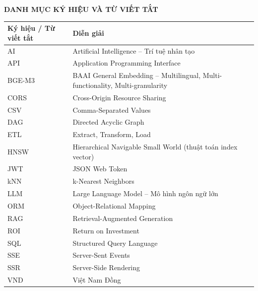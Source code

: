 \thispagestyle{empty}


\listoffigures

\newpage

\thispagestyle{empty}


\listoftables

\newpage

\thispagestyle{empty}

\begin{center}
    {\fontsize{13}{16}\selectfont\bfseries DANH MỤC KÝ HIỆU VÀ TỪ VIẾT TẮT}
\end{center}

\vspace{0.8cm}

\begin{longtable}{|p{3.5cm}|p{9.5cm}|}
    \hline
    \textbf{Ký hiệu / Từ viết tắt} & \textbf{Diễn giải} \\
    \hline
    AI & Artificial Intelligence -- Trí tuệ nhân tạo \\
    \hline
    API & Application Programming Interface \\
    \hline
    BGE-M3 & BAAI General Embedding -- Multilingual, Multi-functionality, Multi-granularity \\
    \hline
    CORS & Cross-Origin Resource Sharing \\
    \hline
    CSV & Comma-Separated Values \\
    \hline
    DAG & Directed Acyclic Graph \\
    \hline
    ETL & Extract, Transform, Load \\
    \hline
    HNSW & Hierarchical Navigable Small World (thuật toán index vector) \\
    \hline
    JWT & JSON Web Token \\
    \hline
    kNN & k-Nearest Neighbors \\
    \hline
    LLM & Large Language Model -- Mô hình ngôn ngữ lớn \\
    \hline
    ORM & Object-Relational Mapping \\
    \hline
    RAG & Retrieval-Augmented Generation \\
    \hline
    ROI & Return on Investment \\
    \hline
    SQL & Structured Query Language \\
    \hline
    SSE & Server-Sent Events \\
    \hline
    SSR & Server-Side Rendering \\
    \hline
    VND & Việt Nam Đồng \\
    \hline
\end{longtable}

\newpage
